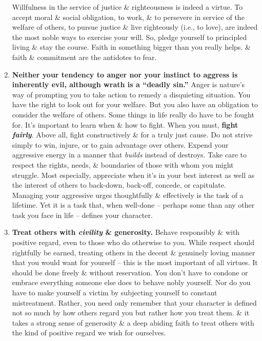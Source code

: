 \documentclass{article}
\numberwithin{equation}{section}
\begin{document}
\begin{enumerate}
	Willfulness in the service of justice \& righteousness is indeed a virtue. To accept moral \& social obligation, to work, \& to persevere in service of the welfare of others, to pursue justice \& live righteously (i.e., to love), are indeed the most noble ways to exercise your will. So, pledge yourself to principled living \& stay the course. Faith in something bigger than you really helps. \& faith \& commitment are the antidotes to fear.
	\item \textbf{Neither your tendency to anger nor your instinct to aggress is inherently evil, although wrath is a ``deadly sin.''} Anger is nature's way of prompting you to take action to remedy a disquieting situation. You have the right to look out for your welfare. But you also have an obligation to consider the welfare of others. Some things in life really do have to be fought for. It's important to learn when \& how to fight. When you must, \textbf{fight \textit{fairly}}. Above all, fight constructively \& for a truly just cause. Do not strive simply to win, injure, or to gain advantage over others. Expend your aggressive energy in a manner that \textit{builds} instead of destroys. Take care to respect the rights, needs, \& boundaries of those with whom you might struggle. Most especially, appreciate when it's in your best interest as well as the interest of others to back-down, back-off, concede, or capitulate. Managing your aggressive urges thoughtfully \& effectively is the task of a lifetime. Yet it is a task that, when well-done -- perhaps some than any other task you face in life -- defines your character.
	\item \textbf{Treat others with \textit{civility} \& \textbf{generosity}.} Behave responsibly \& with positive regard, even to those who do otherwise to you. While respect should rightfully be earned, treating others in the decent \& genuinely loving manner that you would want for yourself -- this is the most important of all virtues. It should be done freely \& without reservation. You don't have to condone or embrace everything someone else does to behave nobly yourself. Nor do you have to make yourself a victim by subjecting yourself to constant mistreatment. Rather, you need only remember that your character is defined not so much by how others regard you but rather how you treat them. \& it takes a strong sense of generosity \& a deep abiding faith to treat others with the kind of positive regard we wish for ourselves.
	

\end{enumerate}
\end{document}
